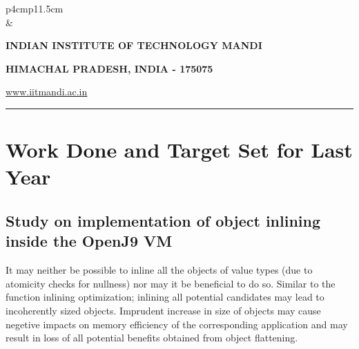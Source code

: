 \documentclass[12 pt, a4paper]{article}
\newcommand{\HRule}{\rule{\linewidth}{1mm}}
\begin{document}
\clearpage

\pagestyle{empty}
\vskip 0.2cm
	\begin{tabular}{p{4cm}p{11.5cm}}
		  \\
		& \centering \large\bf\phantom{Empty line}\\ 
		\rule{0pt}{1pt} \centering \large\bf{INDIAN INSTITUTE OF TECHNOLOGY MANDI} \\
		\rule{0pt}{1pt} \centering \large\bf{HIMACHAL PRADESH, INDIA - 175075} \\
		\rule{0pt}{1pt} \centering \underline{\href{www.iitmandi.ac.in}{www.iitmandi.ac.in}}\\
	\end{tabular}
\noindent

{\raggedleft{}\HRule}

\section{Work Done and Target Set for Last Year}

\subsection{Study on implementation of object inlining inside the OpenJ9 VM}
\label{subsec:Subsection1}
It may neither be possible to inline all the objects of value types (due to atomicity checks for 
nullness) nor may it be beneficial to do so.
Similar to the function inlining optimization; inlining all potential candidates 
may lead to incoherently sized objects.
Imprudent increase in size of objects may cause negetive impacts on memory efficiency of the 
corresponding application and may result 
in loss of all potential benefits obtained from object flattening. 
\end{document}
